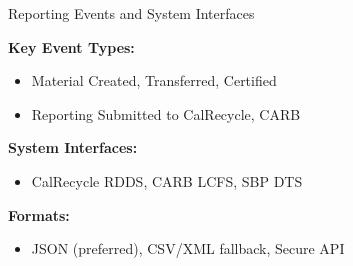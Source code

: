 \documentclass[presentation]{beamer}
\begin{document}
\begin{frame}{Reporting Events and System Interfaces}
\small

\textbf{Key Event Types:}
\begin{itemize}[noitemsep]
    \item Material Created, Transferred, Certified
    \item Reporting Submitted to CalRecycle, CARB
\end{itemize}

\vspace{0.5em}
\textbf{System Interfaces:}
\begin{itemize}[noitemsep]
    \item CalRecycle RDDS, CARB LCFS, SBP DTS
\end{itemize}

\vspace{0.5em}
\textbf{Formats:}
\begin{itemize}[noitemsep]
    \item JSON (preferred), CSV/XML fallback, Secure API
\end{itemize}

\end{frame}
\end{document}
